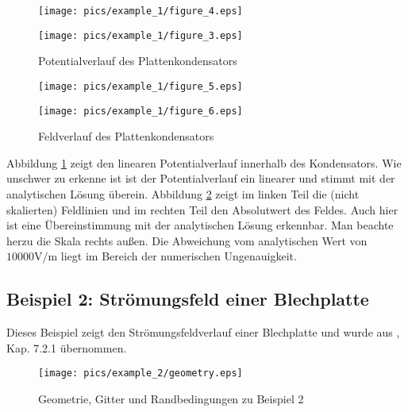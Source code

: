 \begin{figure}[htbp]
	\begin{minipage}{0.5\textwidth}
		\texttt{[image: pics/example\_1/figure\_4.eps]}
	\end{minipage}
	\begin{minipage}{0.5\textwidth}
		\texttt{[image: pics/example\_1/figure\_3.eps]}
	\end{minipage}
\caption{Potentialverlauf des Plattenkondensators}
\label{fig:plate_cape_potential}
\end{figure}

\begin{figure}[htbp]
	\begin{minipage}{0.5\textwidth}
		\texttt{[image: pics/example\_1/figure\_5.eps]}
	\end{minipage}
	\begin{minipage}{0.5\textwidth}
		\texttt{[image: pics/example\_1/figure\_6.eps]}
	\end{minipage}
	\caption{Feldverlauf des Plattenkondensators}
	\label{fig:plate_cape_field}
\end{figure}

Abbildung \ref{fig:plate_cape_potential} zeigt den linearen Potentialverlauf innerhalb des Kondensators. Wie unschwer zu erkenne ist ist der Potentialverlauf ein linearer und stimmt mit der analytischen Lösung überein.\newline
 Abbildung \ref{fig:plate_cape_field} zeigt im linken Teil die (nicht skalierten) Feldlinien und im rechten Teil den Absolutwert des Feldes. Auch hier ist eine Übereinstimmung mit der analytischen Lösung erkennbar. Man beachte herzu die Skala rechts außen. Die Abweichung vom analytischen Wert von $10000\si{\volt\per\meter}$ liegt im Bereich der numerischen Ungenauigkeit.
\newpage


\subsection{Beispiel 2: Strömungsfeld einer Blechplatte}
Dieses Beispiel zeigt den Strömungsfeldverlauf einer Blechplatte und wurde aus \cite{SMS_VO_skript}, Kap. 7.2.1 übernommen.\newline

\begin{figure}[H]
	\centering
	\texttt{[image: pics/example\_2/geometry.eps]}
	\caption{Geometrie, Gitter und Randbedingungen zu Beispiel 2}
\end{figure}



